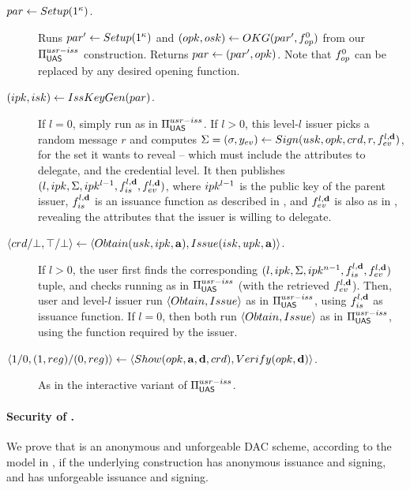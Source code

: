 \begin{description}
\item[$par \gets Setup(1^\kappa)$.]  Runs $par' \gets Setup(1^\kappa)$
  and $(opk,osk) \gets OKG(par',f_{op}^0)$ from our
  $\Pi_{\mathsf{UAS}}^{usr-iss}$ construction. Returns $par \gets (par',opk)$. Note
  that $f_{op}^0$ can be replaced by any desired opening function.
\item[$(ipk,isk) \gets IssKeyGen(par)$.] If $l=0$, simply run \IKeyGen as
  in $\Pi_{\mathsf{UAS}}^{usr-iss}$. If $l>0$, this level-$l$ issuer picks a random
  message $r$ and computes $\Sigma = (\sigma,y_{ev}) \gets Sign(usk,opk,crd,r,
  f_{ev}^{l,\mathbf{d}})$, for the \dattrs set it wants to reveal -- which must
  include the attributes to delegate, and the credential level. It then
  publishes $(l,ipk,\Sigma,ipk^{l-1},f_{is}^{l,\mathbf{d}},f_{ev}^{l,\mathbf{d}})$,
  where $ipk^{l-1}$ is the public key of the parent issuer,
  $f_{is}^{l,\mathbf{d}}$ is an issuance function as described in
  , and $f_{ev}^{l,\mathbf{d}}$ is also as in
  , revealing the attributes that the issuer is
  willing to delegate.
\item[$\langle crd/\bot,\top/\bot \rangle \gets
  \langle Obtain(usk,ipk,\mathbf{a}),Issue(isk,upk,\mathbf{a}) \rangle$.]
  If $l>0$, the user first finds the corresponding $(l,ipk,\Sigma,ipk^{n-1},
  f_{is}^{l,\mathbf{d}},f_{ev}^{l,\mathbf{d}})$ tuple, and checks \Sig running
  \Verify as in $\Pi_{\mathsf{UAS}}^{usr-iss}$ (with the retrieved $f_{ev}^{l,\mathbf{d}}$).
  Then, user and level-$l$ issuer run $\langle Obtain,Issue\rangle$ as in
  $\Pi_{\mathsf{UAS}}^{usr-iss}$, using $f_{is}^{l,\mathbf{d}}$ as issuance function. If
  $l=0$, then both run $\langle Obtain,Issue\rangle$ as in
  $\Pi_{\mathsf{UAS}}^{usr-iss}$, using the \fissue function required by the issuer.
\item[$\langle 1/0,(1,reg)/(0,reg)\rangle
  \gets \langle Show(opk,\mathbf{a},\mathbf{d},crd),
  Verify(opk,\mathbf{d}) \rangle$.] As in the interactive variant of
  $\Pi_{\mathsf{UAS}}^{usr-iss}$.  
\end{description}

\paragraph{Security of \CUASDAC.} %
We prove that \CUASDAC is an anonymous and unforgeable DAC scheme, according to
the model in , if the underlying \CUASGen construction has
anonymous issuance and signing, and has unforgeable issuance and signing. 

